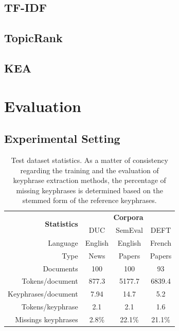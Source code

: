  \subsection{TF-IDF}
  \label{subsec:tfidf}
  \subsection{TopicRank}
  \label{subsec:topicrank}
  \subsection{KEA}
  \label{subsec:kea}

\section{Evaluation}
\label{sec:evaluation}

  \subsection{Experimental Setting}
  \label{subsec:experimental_setting}
    \begin{table}
      \centering
      \begin{tabular}{rccc}
        \toprule
        \multirow{2}{*}[-2pt]{\textbf{Statistics}} & \multicolumn{3}{c}{\textbf{Corpora}}\\
        \cmidrule{2-4}
        & DUC & SemEval & DEFT\\
        \midrule
        Language & English & English & French\\
        Type & News & Papers & Papers\\
        Documents & 100 & 100 & 93\\
        Tokens/document & 877.3 & 5177.7 & 6839.4\\
        Keyphrases/document & 7.94 & 14.7 & 5.2\\
        Tokens/keyphrase & 2.1 & 2.1 & 1.6\\
        Missings keyphrases & 2.8\% & 22.1\% & 21.1\% \\
        \bottomrule
      \end{tabular}
      \caption{Test dataset statistics. As a matter of consistency regarding
               the training and the evaluation of keyphrase extraction methods,
               the percentage of missing keyphrases is determined based on the
               stemmed form of the reference keyphrases.
               \label{tab:test_dataset_statistics}}
    \end{table}


